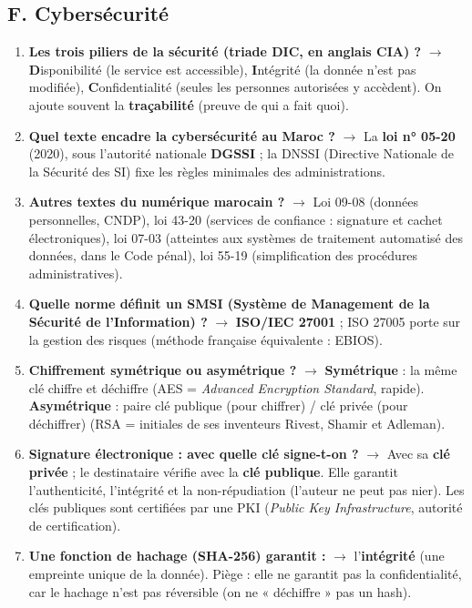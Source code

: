 \subsection*{F. Cybersécurité}
\begin{enumerate}[leftmargin=*]
    \item \textbf{Les trois piliers de la sécurité (triade DIC, en anglais CIA) ?} $\rightarrow$ \textbf{D}isponibilité (le service est accessible), \textbf{I}ntégrité (la donnée n'est pas modifiée), \textbf{C}onfidentialité (seules les personnes autorisées y accèdent). On ajoute souvent la \textbf{traçabilité} (preuve de qui a fait quoi).
    \item \textbf{Quel texte encadre la cybersécurité au Maroc ?} $\rightarrow$ La \textbf{loi n° 05-20} (2020), sous l'autorité nationale \textbf{DGSSI} ; la DNSSI (Directive Nationale de la Sécurité des SI) fixe les règles minimales des administrations.
    \item \textbf{Autres textes du numérique marocain ?} $\rightarrow$ Loi 09-08 (données personnelles, CNDP), loi 43-20 (services de confiance : signature et cachet électroniques), loi 07-03 (atteintes aux systèmes de traitement automatisé des données, dans le Code pénal), loi 55-19 (simplification des procédures administratives).
    \item \textbf{Quelle norme définit un SMSI (Système de Management de la Sécurité de l'Information) ?} $\rightarrow$ \textbf{ISO/IEC 27001} ; ISO 27005 porte sur la gestion des risques (méthode française équivalente : EBIOS).
    \item \textbf{Chiffrement symétrique ou asymétrique ?} $\rightarrow$ \textbf{Symétrique} : la même clé chiffre et déchiffre (AES = \textit{Advanced Encryption Standard}, rapide). \textbf{Asymétrique} : paire clé publique (pour chiffrer) / clé privée (pour déchiffrer) (RSA = initiales de ses inventeurs Rivest, Shamir et Adleman).
    \item \textbf{Signature électronique : avec quelle clé signe-t-on ?} $\rightarrow$ Avec sa \textbf{clé privée} ; le destinataire vérifie avec la \textbf{clé publique}. Elle garantit l'authenticité, l'intégrité et la non-répudiation (l'auteur ne peut pas nier). Les clés publiques sont certifiées par une PKI (\textit{Public Key Infrastructure}, autorité de certification).
    \item \textbf{Une fonction de hachage (SHA-256) garantit :} $\rightarrow$ l'\textbf{intégrité} (une empreinte unique de la donnée). Piège : elle ne garantit pas la confidentialité, car le hachage n'est pas réversible (on ne « déchiffre » pas un hash).

\end{enumerate}
